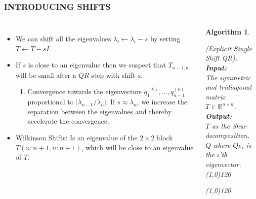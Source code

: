 \documentclass[a4paper,8pt]{beamer} %
\newtheorem{algo}{Algorithm}%
\begin{document}
\begin{frame}  %
\frametitle{INTRODUCING SHIFTS}
\begin{columns}

\column{7cm}
\begin{itemize}
	\item We can shift all the eigenvalues $\lambda_i\gets\lambda_{i}-s$ 
	by setting $T\gets T-sI$.
	\item 
	If $s$ is close to an eigenvalue then we suspect that 
	$T_{n-1,n}$ will be small after a $QR$ step with shift $s$. 
	\begin{enumerate}
	\item
	Convergence towards the eigenvectors $q^{(k)}_1,\dots,q^{(k)}_{n-1}$
	proportional to $|\lambda_{n-1}/\lambda_{n}|$.
	If $s\approx\lambda_{n}$, we increase the separation 
	between the eigenvalues and thereby accelerate the convergence. 
	\end{enumerate}
	\item Wilkinson Shifts: Is an eigenvalue of the $2\times2$ block $T(n:n+1, n:n+1)$, which
	will be close to an eigenvalue of $T$. %
\end{itemize}

\column{5cm}
%
%
\begin{algo}
\begin{footnotesize}
{
%
	(Explicit Single Shift QR):
%
}\\
\textbf{Input: }
{
%
	\\The symmetric and tridiagonal matrix $T\in\mathbb R^{n\times n}$.
%
}\\
\textbf{Output: }
{
%
	\\$T$ as the Shur decomposition.
	\\$Q$ where $Qe_i$ is the $i$'th eigenvector.
%
}\\
\line(1,0){120}
\begin{algorithmic}
%
\EndFor{}
%
\end{algorithmic}
\label{algQRSingleShiflExplicit}
\line(1,0){120}
\end{footnotesize}
\end{algo}
%
\end{columns}
\end{frame} %
\end{document}
